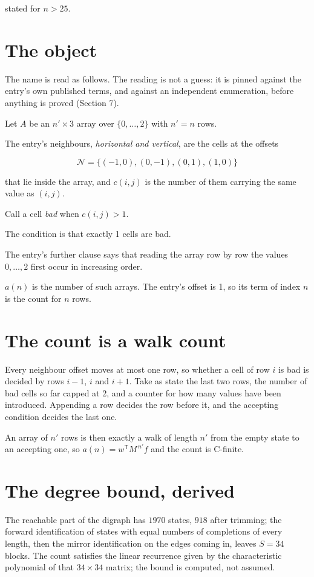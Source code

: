 \documentclass[11pt]{article}
\theoremstyle{definition}
\begin{document}
stated for $n > 25$.

\section{The object}

The name is read as follows. The reading is not a guess: it is pinned against the entry's own published terms, and against an independent enumeration, before anything is proved (Section 7).

Let $A$ be an $n' \times 3$ array over $\{0,\dots,2\}$ with $n' = n$ rows.

The entry's neighbours, {\itshape horizontal and vertical}, are the cells at the offsets

\[\mathcal{N} = \{(-1,0), (0,-1), (0,1), (1,0)\}\]

that lie inside the array, and $c(i,j)$ is the number of them carrying the same value as $(i,j)$.

Call a cell {\itshape bad} when $c(i,j) > 1$.

The condition is that exactly 1 cells are bad.

The entry's further clause says that reading the array row by row the values $0,\dots,2$ first occur in increasing order.

$a(n)$ is the number of such arrays. The entry's offset is 1, so its term of index $n$ is the count for $n$ rows.

\section{The count is a walk count}

Every neighbour offset moves at most one row, so whether a cell of row $i$ is bad is decided by rows $i-1$, $i$ and $i+1$. Take as state the last two rows, the number of bad cells so far capped at 2, and a counter for how many values have been introduced. Appending a row decides the row before it, and the accepting condition decides the last one.

An array of $n'$ rows is then exactly a walk of length $n'$ from the empty state to an accepting one, so $a(n) = w^{\mathsf T}M^{\,n'}f$ and the count is C-finite.

\section{The degree bound, derived}

The reachable part of the digraph has $1970$ states, $918$ after trimming; the forward identification of states with equal numbers of completions of every length, then the mirror identification on the edges coming in, leaves $S = 34$ blocks. The count satisfies the linear recurrence given by the characteristic polynomial of that $34\times34$ matrix; the bound is computed, not assumed.
\end{document}
